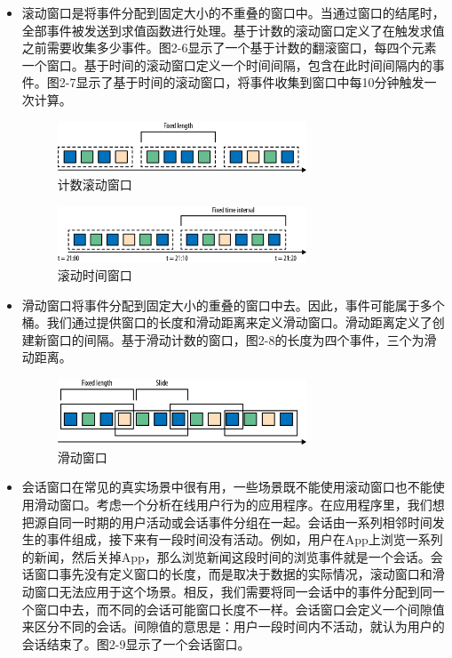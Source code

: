 \documentclass[cn,11pt,chinese]{elegantbook}
\begin{document}
\begin{itemize}
    \item 滚动窗口是将事件分配到固定大小的不重叠的窗口中。当通过窗口的结尾时，全部事件被发送到求值函数进行处理。基于计数的滚动窗口定义了在触发求值之前需要收集多少事件。图2-6显示了一个基于计数的翻滚窗口，每四个元素一个窗口。基于时间的滚动窗口定义一个时间间隔，包含在此时间间隔内的事件。图2-7显示了基于时间的滚动窗口，将事件收集到窗口中每10分钟触发一次计算。
        \begin{figure}[htbp]
          \centering
          \includegraphics[width=0.7\textwidth]{images/spaf_0206.png}
          \caption{计数滚动窗口}
        \end{figure}
        \begin{figure}[htbp]
          \centering
          \includegraphics[width=0.7\textwidth]{images/spaf_0207.png}
          \caption{滚动时间窗口}
        \end{figure}
    \item 滑动窗口将事件分配到固定大小的重叠的窗口中去。因此，事件可能属于多个桶。我们通过提供窗口的长度和滑动距离来定义滑动窗口。滑动距离定义了创建新窗口的间隔。基于滑动计数的窗口，图2-8的长度为四个事件，三个为滑动距离。
        \begin{figure}[htbp]
          \centering
          \includegraphics[width=0.7\textwidth]{images/spaf_0208.png}
          \caption{滑动窗口}
        \end{figure}
    \item 会话窗口在常见的真实场景中很有用，一些场景既不能使用滚动窗口也不能使用滑动窗口。考虑一个分析在线用户行为的应用程序。在应用程序里，我们想把源自同一时期的用户活动或会话事件分组在一起。会话由一系列相邻时间发生的事件组成，接下来有一段时间没有活动。例如，用户在App上浏览一系列的新闻，然后关掉App，那么浏览新闻这段时间的浏览事件就是一个会话。会话窗口事先没有定义窗口的长度，而是取决于数据的实际情况，滚动窗口和滑动窗口无法应用于这个场景。相反，我们需要将同一会话中的事件分配到同一个窗口中去，而不同的会话可能窗口长度不一样。会话窗口会定义一个间隙值来区分不同的会话。间隙值的意思是：用户一段时间内不活动，就认为用户的会话结束了。图2-9显示了一个会话窗口。

\end{itemize}
\end{document}
